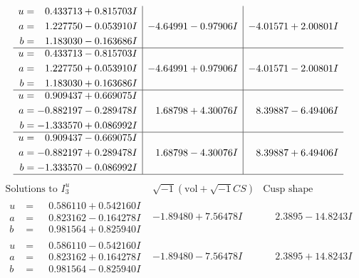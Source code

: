 \documentclass[1p]{elsarticle_modified}
\theoremstyle{definition}
\newcommand{\I}{\sqrt{-1}}
\begin{document}
$$\begin{array}{c|c|c}
\begin{aligned}
u &= \phantom{-}0.433713 + 0.815703 I \\
a &= \phantom{-}1.227750 - 0.053910 I \\
b &= \phantom{-}1.183030 - 0.163686 I\end{aligned}
 & -4.64991 - 0.97906 I & -4.01571 + 2.00801 I \\ \hline\begin{aligned}
u &= \phantom{-}0.433713 - 0.815703 I \\
a &= \phantom{-}1.227750 + 0.053910 I \\
b &= \phantom{-}1.183030 + 0.163686 I\end{aligned}
 & -4.64991 + 0.97906 I & -4.01571 - 2.00801 I \\ \hline\begin{aligned}
u &= \phantom{-}0.909437 + 0.669075 I \\
a &= -0.882197 - 0.289478 I \\
b &= -1.333570 + 0.086992 I\end{aligned}
 & \phantom{-}1.68798 + 4.30076 I & \phantom{-}8.39887 - 6.49406 I \\ \hline\begin{aligned}
u &= \phantom{-}0.909437 - 0.669075 I \\
a &= -0.882197 + 0.289478 I \\
b &= -1.333570 - 0.086992 I\end{aligned}
 & \phantom{-}1.68798 - 4.30076 I & \phantom{-}8.39887 + 6.49406 I\\
 \hline 
 \end{array}$$\newpage$$\begin{array}{c|c|c}  
\text{Solutions to }I^u_{3}& \I (\text{vol} + \sqrt{-1}CS) & \text{Cusp shape}\\
 \hline 
\begin{aligned}
u &= \phantom{-}0.586110 + 0.542160 I \\
a &= \phantom{-}0.823162 - 0.164278 I \\
b &= \phantom{-}0.981564 + 0.825940 I\end{aligned}
 & -1.89480 + 7.56478 I & \phantom{-}2.3895 - 14.8243 I \\ \hline\begin{aligned}
u &= \phantom{-}0.586110 - 0.542160 I \\
a &= \phantom{-}0.823162 + 0.164278 I \\
b &= \phantom{-}0.981564 - 0.825940 I\end{aligned}
 & -1.89480 - 7.56478 I & \phantom{-}2.3895 + 14.8243 I \\ \hline\begin{aligned}

\end{aligned}
\end{array}$$
\end{document}
